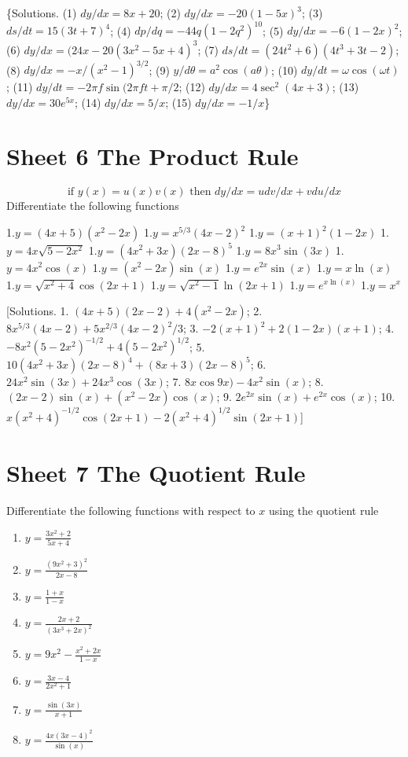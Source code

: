 \documentclass[
  11pt,
  oneside]{book}
\providecommand{\tightlist}{%
  \setlength{\itemsep}{0pt}\setlength{\parskip}{0pt}}
\newcommand{\slide}{}
\theoremstyle{definition}
\theoremstyle{definition}
\theoremstyle{definition}
\theoremstyle{definition}
\theoremstyle{remark}
\begin{document}
\slide

\{Solutions. (1) \(dy/dx=8x+20\); (2) \(dy/dx=-20(1-5x)^3\); (3) \(ds/dt=15(3t+7)^4\); (4) \(dp/dq=-44q(1-2q^2)^{10}\); (5) \(dy/dx=-6(1-2x)^2\); (6) \(dy/dx=(24x-20(3x^2-5x+4)^3\); (7) \(ds/dt=(24t^2+6)(4t^3+3t-2)\); (8) \(dy/dx=-x/(x^2-1)^{3/2}\); (9) \(y/d\theta=a^2\cos(a\theta)\); (10) \(dy/dt=\omega\cos(\omega t)\); (11) \(dy/dt=-2\pi f\sin(2\pi ft+\pi/2\); (12) \(dy/dx=4\sec^2(4x+3)\); (13) \(dy/dx=30e^{5x}\); (14) \(dy/dx=5/x\); (15) \(dy/dx=-1/x\)\}
\slide

\section{Sheet 6 The Product Rule}\label{sheet-6-the-product-rule}

\[
\text{if }y(x)=u(x)v(x)\text{ then }dy/dx=udv/dx+vdu/dx
\]
Differentiate the following functions

1.\(y=(4x+5)(x^2-2x)\)
1.\(y=x^{5/3}(4x-2)^2\)
1.\(y=(x+1)^2(1-2x)\)
1.\(y=4x\sqrt{5-2x^2}\)
1.\(y=(4x^2+3x)(2x-8)^5\)
1.\(y=8x^3\sin(3x)\)
1.\(y=4x^2\cos(x)\)
1.\(y=(x^2-2x)\sin(x)\)
1.\(y=e^{2x}\sin(x)\)
1.\(y=x\ln(x)\)
1.\(y=\sqrt{x^2+4}\cos(2x+1)\)
1.\(y=\sqrt{x^2-1}\ln(2x+1)\)
1.\(y=e^{x\ln(x)}\)
1.\(y=x^x\)

\slide

{[}Solutions. 1. \((4x+5)(2x-2)+4(x^2-2x)\); 2. \(8x^{5/3}(4x-2)+5x^{2/3}(4x-2)^2/3\); 3. \(-2(x+1)^2+2(1-2x)(x+1)\); 4. \(-8x^2(5-2x^2)^{-1/2}+4(5-2x^2)^{1/2}\); 5. \(10(4x^2+3x)(2x-8)^4+(8x+3)(2x-8)^5\); 6. \(24x^2\sin(3x)+24x^3\cos(3x)\); 7. \(8x\cos9x)-4x^2\sin(x)\); 8. \((2x-2)\sin(x)+(x^2-2x)\cos(x)\); 9. \(2e^{2x}\sin(x)+e^{2x}\cos(x)\); 10. \(x(x^2+4)^{-1/2}\cos(2x+1)-2(x^2+4)^{1/2}\sin(2x+1)\){]}
\slide

\section{Sheet 7 The Quotient Rule}\label{sheet-7-the-quotient-rule}

Differentiate the following functions with respect to \(x\) using the quotient rule

\begin{enumerate}
\def\labelenumi{\arabic{enumi}.}
\tightlist
\item
  \(y=\frac{3x^2+2}{5x+4}\)
\item
  \(y=\frac{(9x^2+3)^2}{2x-8}\)
\item
  \(y=\frac{1+x}{1-x}\)
\item
  \(y=\frac{2x+2}{(3x^3+2x)^2}\)
\item
  \(y=9x^2-\frac{x^2+2x}{1-x}\)
\item
  \(y=\frac{3x-4}{2x^2+1}\)
\item
  \(y=\frac{\sin(3x)}{x+1}\)
\item
  \(y=\frac{4x(3x-4)^2}{\sin(x)}\)
\end{enumerate}
\end{document}
